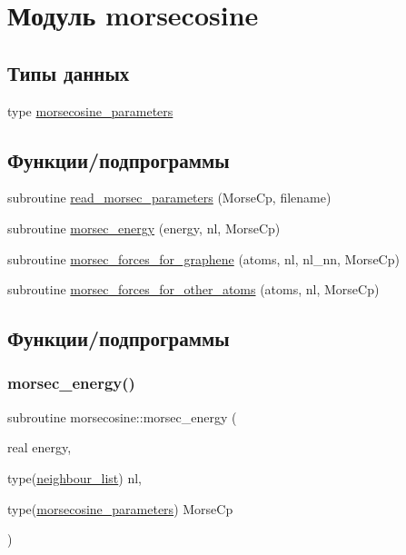 \hypertarget{namespacemorsecosine}{}\section{Модуль morsecosine}
\label{namespacemorsecosine}
\subsection*{Типы данных}
\begin{DoxyCompactItemize}
\item 
type \mbox{\hyperlink{structmorsecosine_1_1morsecosine__parameters}{morsecosine\+\_\+parameters}}
\end{DoxyCompactItemize}
\subsection*{Функции/подпрограммы}
\begin{DoxyCompactItemize}
\item 
subroutine \mbox{\hyperlink{namespacemorsecosine_a2d4790950d9c660d18edf6f5dace6031}{read\+\_\+morsec\+\_\+parameters}} (Morse\+Cp, filename)
\item 
subroutine \mbox{\hyperlink{namespacemorsecosine_ab16ff8dd21fbf36d2c97a3905d47702b}{morsec\+\_\+energy}} (energy, nl, Morse\+Cp)
\item 
subroutine \mbox{\hyperlink{namespacemorsecosine_ab762564d1cafd5251e7aac73fbd757db}{morsec\+\_\+forces\+\_\+for\+\_\+graphene}} (atoms, nl, nl\+\_\+nn, Morse\+Cp)
\item 
subroutine \mbox{\hyperlink{namespacemorsecosine_afcca4f80b6e7596c0d7ed68b7346da99}{morsec\+\_\+forces\+\_\+for\+\_\+other\+\_\+atoms}} (atoms, nl, Morse\+Cp)
\end{DoxyCompactItemize}


\subsection{Функции/подпрограммы}
\mbox{\label{namespacemorsecosine_ab16ff8dd21fbf36d2c97a3905d47702b}} 
\subsubsection{\texorpdfstring{morsec\+\_\+energy()}{morsec\_energy()}}
{\footnotesize\ttfamily subroutine morsecosine\+::morsec\+\_\+energy (\begin{DoxyParamCaption}\item[{real}]{energy,  }\item[{type(\mbox{\hyperlink{structmd__general_1_1neighbour__list}{neighbour\+\_\+list}})}]{nl,  }\item[{type(\mbox{\hyperlink{structmorsecosine_1_1morsecosine__parameters}{morsecosine\+\_\+parameters}})}]{Morse\+Cp }\end{DoxyParamCaption})}



